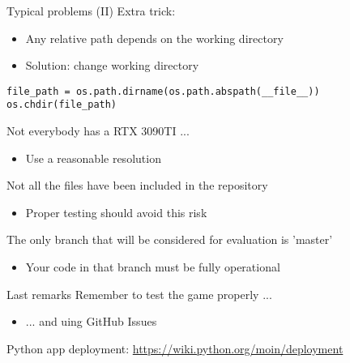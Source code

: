 \documentclass[10pt,compress]{beamer} %
\begin{document}
\begin{frame}[fragile]{Typical problems (II)}
    Extra trick:
    \begin{itemize}
        \item Any relative path depends on the working directory
        \item Solution: change working directory
    \end{itemize}

    \begin{block}{}
    \begin{verbatim}
file_path = os.path.dirname(os.path.abspath(__file__))
os.chdir(file_path)
\end{verbatim}
\end{block}

    Not everybody has a RTX 3090TI ...
    \begin{itemize}
        \item Use a reasonable resolution
    \end{itemize}

    Not all the files have been included in the repository
    \begin{itemize}
        \item Proper testing should avoid this risk
    \end{itemize}

    The only branch that will be considered for evaluation is 'master'
    \begin{itemize}
        \item Your code in that branch must be fully operational
    \end{itemize}
\end{frame}

\begin{frame}{Last remarks}
	Remember to test the game properly ...
	    \begin{itemize}
		    \item ... and uing GitHub Issues
	    \end{itemize}
	\bigskip
	Python app deployment: \url{https://wiki.python.org/moin/deployment}
\end{frame}



\end{document}
